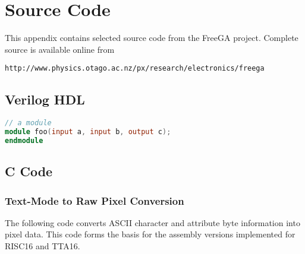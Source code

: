 \chapter{Source Code}

This appendix contains selected source code from the FreeGA project. Complete source is available online from 
\begin{verbatim}
http://www.physics.otago.ac.nz/px/research/electronics/freega
\end{verbatim}

\section{Verilog HDL}

\begin{lstlisting}[language=Verilog]
// a module
module foo(input a, input b, output c);
endmodule

\end{lstlisting}

\section{C Code}

\subsection{Text-Mode to Raw Pixel Conversion}
The following code converts ASCII character and attribute byte information into
pixel data. This code forms the basis for the assembly versions implemented for
RISC16 and TTA16.

